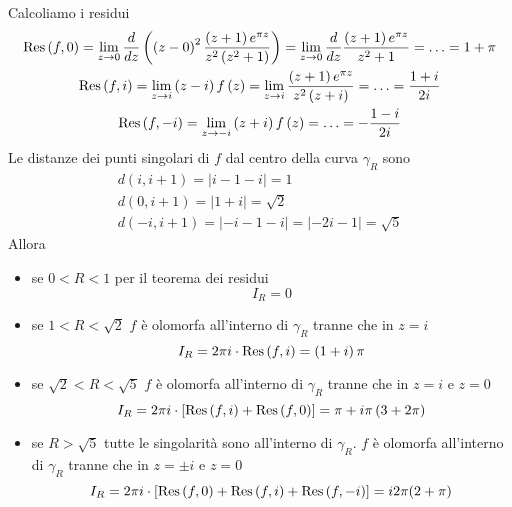 Calcoliamo i residui
\begin{gather*}
\operatorname{Res} \left(f, 0\right) = \lim_{z\rightarrow 0}\frac{d}{dz}\left(\left(z - 0\right)^{2}\frac{\left(z + 1\right) e^{\pi z}}{z^{2}\left(z^{2} + 1\right)}\right) = \lim_{z\rightarrow 0}\frac{d}{dz}\frac{\left(z + 1\right) e^{\pi z}}{z^{2} + 1} = \dotsc = 1 + \pi \\
\operatorname{Res} \left(f, i\right) = \lim_{z\rightarrow i}\left(z - i\right) f\left(z\right) = \lim_{z\rightarrow i}\frac{\left(z + 1\right) e^{\pi z}}{z^{2}\left(z + i\right)} = \dotsc = \frac{1 + i}{2i}\\
\operatorname{Res} \left(f, - i\right) = \lim_{z\rightarrow - i}\left(z + i\right) f\left(z\right) = \dotsc = - \frac{1 - i}{2i}
\end{gather*}
Le distanze dei punti singolari di $f$ dal centro della curva $\gamma_{R}$ sono
\begin{gather*}
d\left(i, i + 1\right) = \left| i - 1 - i\right| = 1\\
d\left(0, i + 1\right) = \left| 1 + i\right| = \sqrt{2}\\
d\left(- i, i + 1\right) = \left| - i - 1 - i\right| = \left| - 2i - 1\right| = \sqrt{5}
\end{gather*}
Allora
\begin{itemize}
\item se $0 < R < 1$ per il teorema dei residui
\begin{equation*}
I_{R} = 0
\end{equation*}
\item se $1 < R < \sqrt{2}$ $f$ è olomorfa all'interno di $\gamma_{R}$ tranne che in $z = i$
\begin{equation*}
I_{R} = 2\pi i \cdot \operatorname{Res} \left(f, i\right) = \left(1 + i\right) \pi 
\end{equation*}
\item se $\sqrt{2} < R < \sqrt{5}$ $f$ è olomorfa all'interno di $\gamma_{R}$ tranne che in $z = i$ e $z = 0$
\begin{equation*}
I_{R} = 2\pi i \cdot \left[\operatorname{Res} \left(f, i\right) + \operatorname{Res} \left(f, 0\right)\right] = \pi + i\pi \left(3 + 2\pi\right)
\end{equation*}
\item se $R > \sqrt{5}$ tutte le singolarità sono all'interno di $\gamma_{R}$. $f$ è olomorfa all'interno di $\gamma_{R}$ tranne che in $z = \pm i$ e $z = 0$
\begin{equation*}
I_{R} = 2\pi i \cdot \left[\operatorname{Res} \left(f, 0\right) + \operatorname{Res} \left(f, i\right) + \operatorname{Res} \left(f, - i\right)\right] = i2\pi (2 + \pi)
\end{equation*}
\end{itemize}

